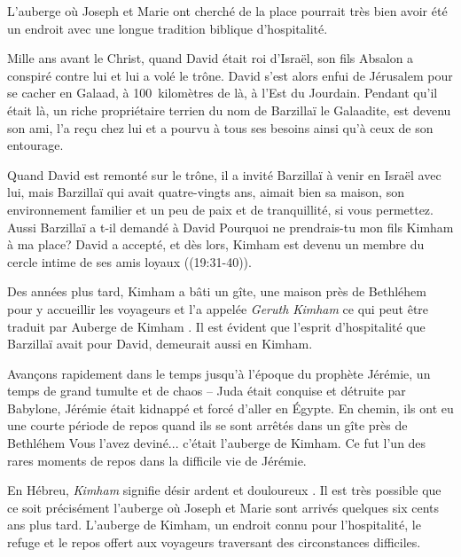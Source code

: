 

L'auberge où Joseph et Marie ont cherché de la place pourrait très bien avoir été un endroit avec une longue tradition biblique d'hospitalité.

Mille ans avant le Christ, quand David était roi d'Israël, son fils Absalon a conspiré contre lui et lui a volé le trône. David s'est alors enfui de Jérusalem pour se cacher en Galaad, à 100~kilomètres de là, à l'Est du Jourdain. Pendant qu'il était là, un riche propriétaire terrien du nom de Barzillaï le Galaadite, est devenu son ami, l'a reçu chez lui et a pourvu à tous ses besoins ainsi qu'à ceux de son entourage.

Quand David est remonté sur le trône, il a invité Barzillaï à venir en Israël avec lui, mais Barzillaï qui avait quatre-vingts ans, aimait bien sa maison, son environnement familier \og et un peu de paix et de tranquillité, si vous permettez. \fg{} Aussi Barzillaï a t-il demandé à David\frcolon{} \og Pourquoi ne prendrais-tu mon fils Kimham à ma place? \fg{} David a accepté, et dès lors, Kimham est devenu un membre du cercle intime de ses amis loyaux ((19:31-40)).

Des années plus tard, Kimham a bâti un gîte, une maison près de Bethléhem pour y accueillir les voyageurs et l'a appelée \emph{Geruth Kimham} ce qui peut être traduit par \og Auberge de Kimham \fg{}. Il est évident que l'esprit d'hospitalité que Barzillaï avait pour David, demeurait aussi en Kimham.

Avançons rapidement dans le temps jusqu'à l'époque du prophète Jérémie, un temps de grand tumulte et de chaos – Juda était conquise et détruite par Babylone, Jérémie était kidnappé et forcé d'aller en Égypte. En chemin, ils ont eu une courte période de repos quand ils se sont arrêtés dans un gîte près de Bethléhem Vous l'avez deviné... c'était l'auberge de Kimham. Ce fut l'un des rares moments de repos dans la difficile vie de Jérémie.

En Hébreu, \emph{Kimham} signifie \og désir ardent et douloureux \fg{}. Il est très possible que ce soit précisément l'auberge où Joseph et Marie sont arrivés quelques six cents ans plus tard. L'auberge de Kimham, un endroit connu pour l'hospitalité, le refuge et le repos offert aux voyageurs traversant des circonstances difficiles.

